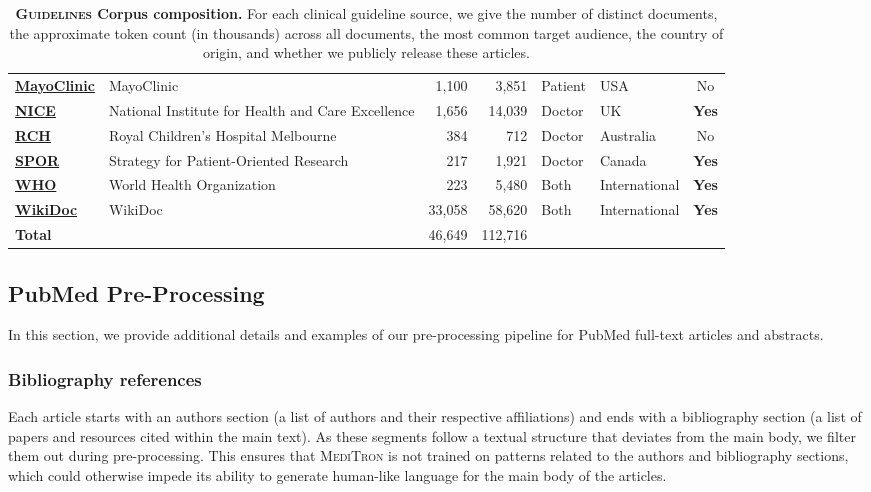\documentclass{article}
\newcommand{\guidelines}{\textsc{Guidelines} }
\newcommand{\mtron}{\textsc{MediTron}\xspace}
\begin{document}
\begin{table}[h!]
{\begin{tabular}{llrrllc}
\textbf{\href{https://www.mayoclinic.org/}{MayoClinic}} & MayoClinic & 1,100 & 3,851 & Patient & USA & No\\
\textbf{\href{https://www.nice.org.uk/guidance}{NICE}} & National Institute for Health and Care Excellence & 1,656 & 14,039 & Doctor & UK & \textbf{Yes}\\
\textbf{\href{https://www.rch.org.au/clinicalguide/about_rch_cpgs/welcome_to_the_clinical_practice_guidelines/}{RCH}} & Royal Children's Hospital Melbourne & 384 & 712 & Doctor & Australia & No\\
\textbf{\href{https://sporevidencealliance.ca/key-activities/cpg-asset-map/cpg-database/}{SPOR}} & Strategy for Patient-Oriented Research & 217 & 1,921 & Doctor & Canada & \textbf{Yes}\\
\textbf{\href{https://www.who.int/publications/who-guidelines}{WHO}} & World Health Organization & 223 & 5,480 & Both & International & \textbf{Yes} \\
\textbf{\href{https://www.wikidoc.org/}{WikiDoc}} & WikiDoc & 33,058 & 58,620 & Both & International & \textbf{Yes}\\
\midrule 
\textbf{Total} & & 46,649 & 112,716 & \\
\bottomrule
\end{tabular}
}
\caption{\textbf{\guidelines Corpus composition.} For each clinical guideline source, we give the number of distinct documents, the approximate token count (in thousands) across all documents, the most common target audience, the country of origin, and whether we publicly release these articles. }
\label{tab:guidelines}
\end{table}

\subsection{PubMed Pre-Processing} 
\label{sec:appendix-pubmed}
In this section, we provide additional details and examples of our pre-processing pipeline for PubMed full-text articles and abstracts. 

\subsubsection{Bibliography references}
Each article starts with an authors section (a list of authors and their respective affiliations) and ends with a bibliography section (a list of papers and resources cited within the main text). 
As these segments follow a textual structure that deviates from the main body, we filter them out during pre-processing.
This ensures that \mtron is not trained on patterns related to the authors and bibliography sections, which could otherwise impede its ability to generate human-like language for the main body of the articles.
\end{document}
